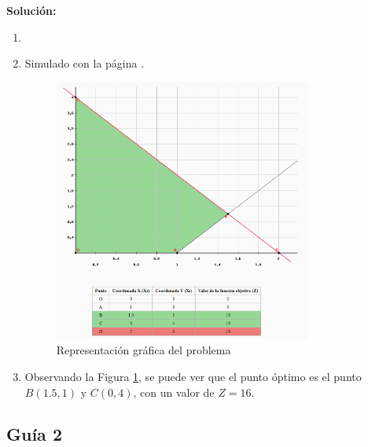 \documentclass[../main.tex]{subfiles}
\begin{document}
\begin{exercise}
            \textbf{Solución:}
            \begin{enumerate}[label=\alph*)]
                \item
                \item Simulado con la página \cite{PL_online}.
                    \begin{figure}[ht]
                        \centering
                        \includegraphics[width=0.8\textwidth]{./images/guia/1-6_ejercicio.png}
                        \caption{Representación gráfica del problema}
                        \label{fig:1-6_ejercicio}
                    \end{figure}
                    
                \item Observando la Figura \ref{fig:1-6_ejercicio}, se puede ver que el punto óptimo es el punto $B(1.5,1)$ y $C(0,4)$, con un valor de $Z = 16$.
            \end{enumerate}
        \end{exercise}

        \newpage

    \subsection{Guía 2}
        \addtocounter{exercise}{-6}
        \setcounter{section}{2} %
\end{document}
